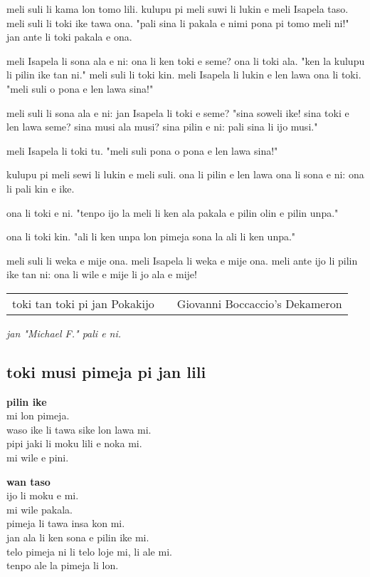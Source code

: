 meli suli li kama lon tomo lili.
kulupu pi meli suwi li lukin e meli Isapela taso.
meli suli li toki ike tawa ona.
"pali sina li pakala e nimi pona pi tomo meli ni!"
jan ante li toki pakala e ona.

meli Isapela li sona ala e ni: ona li ken toki e seme?
ona li toki ala.
"ken la kulupu li pilin ike tan ni."
meli suli li toki kin.
meli Isapela li lukin e len lawa ona li toki.
"meli suli o pona e len lawa sina!"

meli suli li sona ala e ni: jan Isapela li toki e seme?
"sina soweli ike!
sina toki e len lawa seme?
sina musi ala musi?
sina pilin e ni: pali sina li ijo musi."

meli Isapela li toki tu.
"meli suli pona o pona e len lawa sina!"

kulupu pi meli sewi li lukin e meli suli.
ona li pilin e len lawa ona li sona e ni: ona li pali kin e ike.

ona li toki e ni.
"tenpo ijo la meli li ken ala pakala e pilin olin e pilin unpa."

ona li toki kin.
"ali li ken unpa lon pimeja sona la ali li ken unpa."

meli suli li weka e mije ona.
meli Isapela li weka e mije ona.
meli ante ijo li pilin ike tan ni: ona li wile e mije li jo ala e mije!

\begin{supertabular}{p{5,5cm}|ll}
    toki tan toki pi jan Pokakijo &  & Giovanni Boccaccio's Dekameron \\
\end{supertabular}

\textit{jan "Michael F." pali e ni. \cite{www:failbluedot:01}}
%
\subsection{toki musi pimeja pi jan lili}

\textbf{pilin ike} \\
mi lon pimeja.  \\
waso ike li tawa sike lon lawa mi.  \\
pipi jaki li moku lili e noka mi.  \\
mi wile e pini.

\textbf{wan taso} \\
ijo li moku e mi.  \\
mi wile pakala.  \\
pimeja li tawa insa kon mi.  \\
jan ala li ken sona e pilin ike mi.  \\
telo pimeja ni li telo loje mi, li ale mi.  \\
tenpo ale la pimeja li lon.

